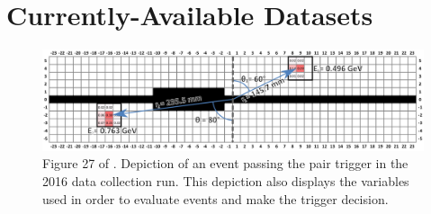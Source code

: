 \section{Currently-Available Datasets}

\begin{figure}
	\centering
	\includegraphics[width=\textwidth]{figures/hps/experiment/smckarty-thesis-fig-27-pair-trigger-depiction.png}
	\caption{
		Figure 27 of \cite{skmccarty-thesis-2020}. Depiction of an event passing the pair trigger
		in the 2016 data collection run. This depiction also displays the variables used in order
		to evaluate events and make the trigger decision.
	}
	\label{fig:hps-pair-trigger-depiction}
\end{figure}